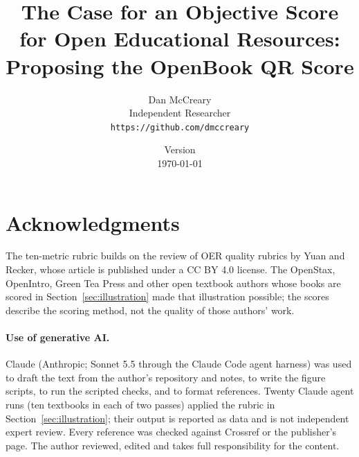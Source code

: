\documentclass[11pt]{article}
\title{The Case for an Objective Score for Open Educational Resources:\\ Proposing the OpenBook QR Score}
\author{
    Dan McCreary \\
    Independent Researcher \\
    \texttt{https://github.com/dmccreary}
}
\date{Version \paperversion \\ \today}
\begin{document}
\maketitle













\section*{Acknowledgments}
The ten-metric rubric builds on the review of OER quality rubrics by Yuan and Recker, whose
article is published under a CC BY 4.0 license. The OpenStax, OpenIntro, Green Tea Press and
other open textbook authors whose books are scored in Section~\ref{sec:illustration} made
that illustration possible; the scores describe the scoring method, not the quality of those
authors' work.

\paragraph{Use of generative AI.}
Claude (Anthropic; Sonnet 5.5 through the Claude Code agent harness) was used to draft the
text from the author's repository and notes, to write the figure scripts, to run the scripted
checks, and to format references. Twenty Claude agent runs (ten textbooks in each of two passes) applied the rubric in
Section~\ref{sec:illustration}; their output is reported as data and is not independent
expert review. Every reference was checked against Crossref or the publisher's page. The author
reviewed, edited and takes full responsibility for the content.



\end{document}

